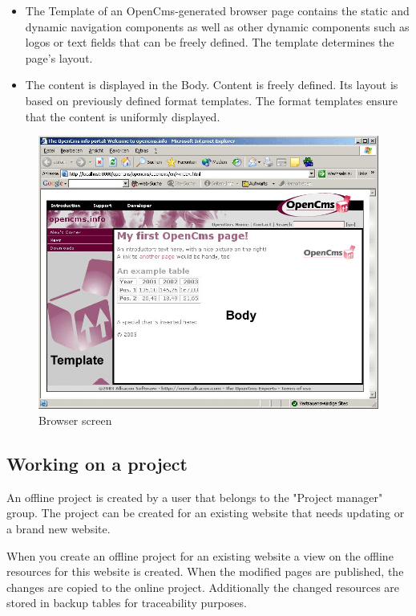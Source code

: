 \begin{itemize}
\item The Template of an OpenCms-generated browser page contains the
static and dynamic navigation components as well as other dynamic
components such as logos or text fields that can be freely
defined. The template determines the page's layout.
\item The content is displayed in the Body. Content is freely defined. Its
layout is based on previously defined format templates. The format
templates ensure that the content is uniformly displayed.
\end{itemize}

\begin{figure}[!hbt]
\begin{center}
\includegraphics[width=\sgw]
                   {pics/usermanual/browserScreen}
\caption[Browser screen]
           {Browser screen}
\label{browserscreen}
\end{center}
\end{figure}

\subsection{Working on a project}

An offline project is created by a user that belongs to the
"Project manager" group. The project can be created for an
existing website that needs updating or a brand new website.

When you create an offline project for an existing website a view
on the offline resources for this website is created. When the
modified pages are published, the changes are copied to the online
project. Additionally the changed resources are stored in backup
tables for traceability purposes.

